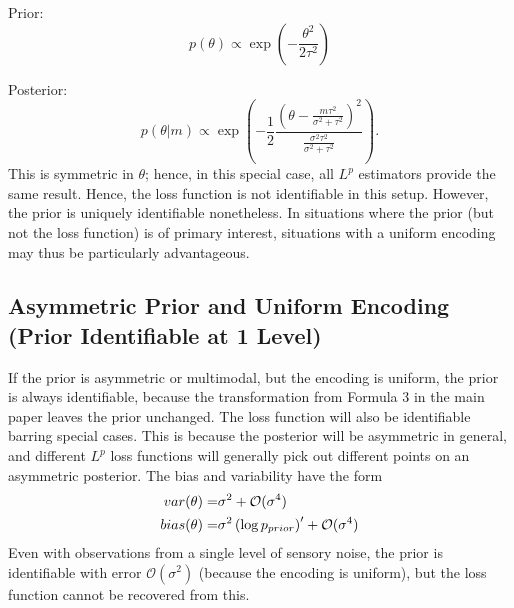 Prior:
\begin{equation}
    p(\theta) \propto \exp(-\frac{\theta^2}{2\tau^2})
\end{equation}

Posterior:
\begin{equation}
p(\theta|m) \propto \exp\left(-\frac{1}{2} \frac{\left(\theta - \frac{m\tau^2}{\sigma^2 + \tau^2}\right)^2}{\frac{\sigma^2 \tau^2}{\sigma^2 + \tau^2}}\right).
\end{equation}
This is symmetric in $\theta$; hence, in this special case, all $L^p$ estimators provide the same result.
Hence, the loss function is not identifiable in this setup.
However, the prior is uniquely identifiable nonetheless.
In situations where the prior (but not the loss function) is of primary interest, situations with  a uniform encoding may thus be particularly advantageous.

\subsection{Asymmetric Prior and Uniform Encoding (Prior Identifiable at 1 Level)}

If the prior is asymmetric or multimodal, but the encoding is uniform, the prior is always identifiable, because the transformation from Formula 3 in the main paper leaves the prior unchanged. The loss function will also be identifiable barring special cases.
This is because the posterior will be asymmetric in general, and different $L^p$ loss functions will generally pick out different points on an asymmetric posterior.
The bias and variability have the form
\begin{align*}
    var(\theta) =& \sigma^2 + \mathcal{O}(\sigma^4) \\
    bias(\theta) =& \sigma^2 \left(\log p_{prior}\right)' + \mathcal{O}(\sigma^4)
\end{align*}
Even with observations from a single level of sensory noise, the prior is identifiable with error $\mathcal{O}(\sigma^2)$ (because the encoding is uniform), but the loss function cannot be recovered from this.

